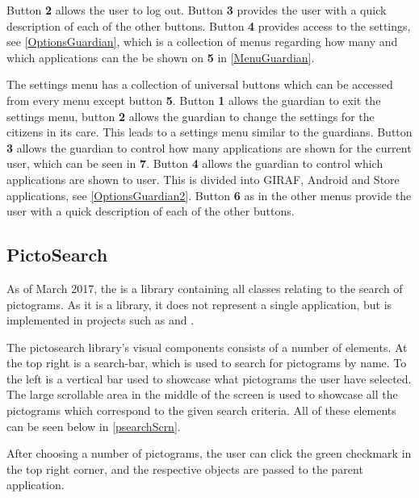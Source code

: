 
Button \textbf{2} allows the user to log out. Button \textbf{3} provides the
user with a quick description of each of the other buttons. Button \textbf{4}
provides access to the settings, see \autoref{OptionsGuardian}, which is a
collection of menus regarding how many and which applications can the be shown
on \textbf{5} in \autoref{MenuGuardian}. 


The settings menu has a collection of universal buttons which can be accessed
from every menu except button \textbf{5}. Button \textbf{1} allows the guardian
to exit the settings menu, button \textbf{2} allows the guardian to change the settings for
the citizens in its care. This leads to a settings menu similar to the guardians.
Button \textbf{3} allows the guardian to control how many applications are
shown for the current user, which can be seen in \textbf{7}. Button \textbf{4}
allows the guardian to control which applications are shown to user. This is
divided into GIRAF, Android and Store applications, see
\autoref{OptionsGuardian2}. Button \textbf{6} as in the other menus provide the
user with a quick description of each of the other buttons.


\subsection{PictoSearch}\label{PictoSearchReview}
As of March 2017, the  is a library containing all
classes relating to the search of pictograms. As it is a library, it does not
represent a single application, but is implemented in projects such as
 and .\nl

The pictosearch library's visual components consists of a number of
elements. At the top right is a search-bar, which is used to search for
pictograms by name. To the left is a vertical bar used to showcase what
pictograms the user have selected. The large scrollable area in the middle of
the screen is used to showcase all the pictograms which correspond to the given
search criteria. All of these elements can be seen below in
\autoref{psearchScrn}.
 

After choosing a number of pictograms, the user can click the green checkmark in
the top right corner, and the respective  objects are passed to
the parent application.